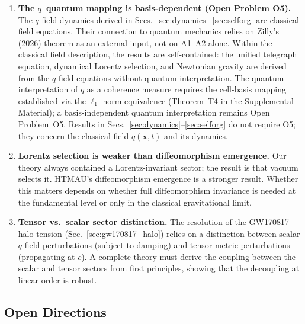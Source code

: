 \documentclass[aps,prd,twocolumn,showpacs,superscriptaddress,preprintnumbers]{revtex4-2}
\begin{document}
\begin{enumerate}
    \item \textbf{The $q$--quantum mapping is basis-dependent (Open Problem O5).}
    The $q$-field dynamics derived in Secs.~\ref{sec:dynamics}--\ref{sec:selforg} are classical field equations.
    Their connection to quantum mechanics relies on Zilly's (2026) theorem as an external input, not on A1--A2 alone.
    Within the classical field description, the results are self-contained: the unified telegraph equation, dynamical Lorentz selection, and Newtonian gravity are derived from the $q$-field equations without quantum interpretation.
    The quantum interpretation of $q$ as a coherence measure requires the cell-basis mapping established via the $\ell_1$-norm equivalence (Theorem~T4 in the Supplemental Material); a basis-independent quantum interpretation remains Open Problem~O5.
    Results in Secs.~\ref{sec:dynamics}--\ref{sec:selforg} do not require O5; they concern the classical field $q(\mathbf{x},t)$ and its dynamics.

    \item \textbf{Lorentz selection is weaker than diffeomorphism emergence.} Our theory always contained a Lorentz-invariant sector; the result is that vacuum selects it. HTMAU's diffeomorphism emergence is a stronger result. Whether this matters depends on whether full diffeomorphism invariance is needed at the fundamental level or only in the classical gravitational limit.

    \item \textbf{Tensor vs.\ scalar sector distinction.} The resolution of the GW170817 halo tension (Sec.~\ref{sec:gw170817_halo}) relies on a distinction between scalar $q$-field perturbations (subject to damping) and tensor metric perturbations (propagating at $c$). A complete theory must derive the coupling between the scalar and tensor sectors from first principles, showing that the decoupling at linear order is robust.
\end{enumerate}

\subsection{Open Directions}
\end{document}
